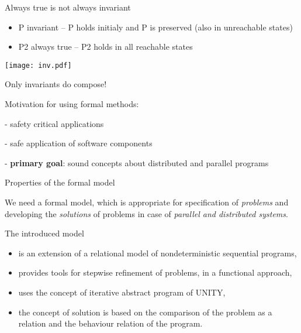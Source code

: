 \documentclass[compress]{beamer}
\begin{document}
\begin{frame}{Always true is not always invariant}

\begin{itemize}

\item  P  invariant -- P holds initialy and P is preserved (also in unreachable states)

\item  P2  always true  -- P2 holds in all reachable states 

\end{itemize}

\texttt{[image: inv.pdf]}

Only invariants do compose!

\end{frame}       

\begin{frame}{}

Motivation for using formal methods: 

- safety critical applications

- safe application of software components

- {\bf primary goal}: sound concepts about distributed and parallel 
programs

\end{frame}




\begin{frame}{Properties of the formal model}


 We need  a  formal model, which is appropriate for 
specification of {\em problems\/} and developing the {\em  solutions}
of problems in case of  
{\em parallel and distributed systems}. 


The introduced model

\begin{itemize}


\item  is an extension of a relational model of nondeterministic 
sequential programs,

 
\item provides tools for stepwise refinement of
problems, in a functional approach,

 
 
\item uses the concept of iterative abstract program
of UNITY,



\item the concept of solution is based on the comparison 
of the  problem as a relation and the behaviour relation of the
program.


\end{itemize}  

\end{frame}
\end{document}
